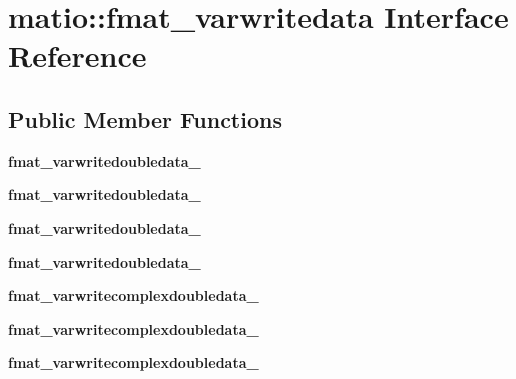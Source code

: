 \hypertarget{interfacematio_1_1fmat__varwritedata}{}\section{matio\+:\+:fmat\+\_\+varwritedata Interface Reference}
\label{interfacematio_1_1fmat__varwritedata}
\subsection*{Public Member Functions}
\begin{DoxyCompactItemize}
\item 
\mbox{\label{interfacematio_1_1fmat__varwritedata_ae089304415cf6320cf4e9f1a010f7bcb}} 
{\bfseries fmat\+\_\+varwritedoubledata\+\_}
\item 
\mbox{\label{interfacematio_1_1fmat__varwritedata_a229864facdb5abc22bb2caf73f2129b2}} 
{\bfseries fmat\+\_\+varwritedoubledata\+\_}
\item 
\mbox{\label{interfacematio_1_1fmat__varwritedata_a6353e85ff82e29949c04d74b0ae2f8f3}} 
{\bfseries fmat\+\_\+varwritedoubledata\+\_}
\item 
\mbox{\label{interfacematio_1_1fmat__varwritedata_a2dd23d5faf0ff7c4a886280238cac874}} 
{\bfseries fmat\+\_\+varwritedoubledata\+\_}
\item 
\mbox{\label{interfacematio_1_1fmat__varwritedata_ae9b234407a55dcd66174608b0bf37ce6}} 
{\bfseries fmat\+\_\+varwritecomplexdoubledata\+\_}
\item 
\mbox{\label{interfacematio_1_1fmat__varwritedata_a038991483a58232f62b25f40c4efe8d2}} 
{\bfseries fmat\+\_\+varwritecomplexdoubledata\+\_}
\item 
\mbox{\label{interfacematio_1_1fmat__varwritedata_a63237b168ea0bca7438dd326bd67c538}} 
{\bfseries fmat\+\_\+varwritecomplexdoubledata\+\_}
\item 
\mbox{\label{interfacematio_1_1fmat__varwritedata_a33a5b87c51e1fe1a0e517f179e6d7310}} 

\end{DoxyCompactItemize}
